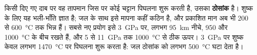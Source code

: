 किसी दिए गए दाब पर वह तापमान जिस पर कोई चट्टान पिघलना शुरू करती है, उसका
\textbf{ठोसांक} है। शुष्क  के लिए यह भली-भाँति ज्ञात है; जल के साथ इसे
मापना कहीं कठिन है, और प्रकाशित मान अब भी 200 से
\qty{600}{\celsius} तक भिन्न हैं। सबसे नए प्रयोग इसे \qty{3}{GPa} पर,
लगभग \qty{95}{km} नीचे, 950 और \qty{1000}{\celsius} के बीच रखते हैं, और 5 से \qty{11}{GPa} तक
\qty{1000}{\celsius} से ठीक ऊपर। \qty{3}{GPa} पर शुष्क 
केवल लगभग \qty{1470}{\celsius} पर पिघलना शुरू करता है: जल ठोसांक को
लगभग \qty{500}{\celsius} घटा देता है।

